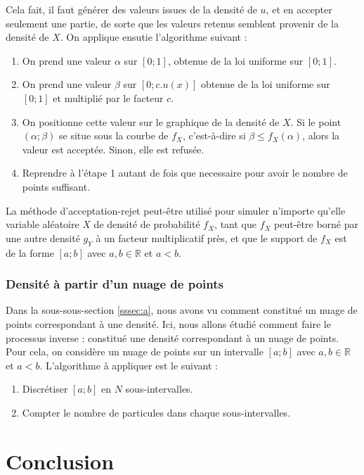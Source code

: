 \documentclass{article}
\begin{document}
Cela fait, il faut générer des valeurs issues de la densité de $u$, et en accepter seulement une partie, de sorte que les valeurs retenus semblent provenir de la densité de $X$. On applique ensutie l'algorithme suivant :
\begin{enumerate}
\item On prend une valeur $\alpha$ sur $[0;1]$, obtenue de la loi uniforme sur $[0;1]$.
\item On prend une valeur $\beta$ sur $[0;c.u(x)]$ obtenue de la loi uniforme sur $[0;1]$ et multiplié par le facteur $c$.
\item On positionne cette valeur sur le graphique de la densité de $X$. Si le point $(\alpha; \beta)$ se situe sous la courbe de $f_X$, c'est-à-dire si $\beta \leq f_X(\alpha)$, alors la valeur est acceptée. Sinon, elle est refusée.
\item Reprendre à l'étape 1 autant de fois que necessaire pour avoir le nombre de points suffisant.
\end{enumerate}
\begin{center}
\end{center}
La méthode d'acceptation-rejet peut-être utilisé pour simuler n'importe qu'elle variable aléatoire $X$ de densité de probabilité $f_X$, tant que $f_X$ peut-être borné par une autre densité $g_Y$ à un facteur multiplicatif près, et que le support de $f_X$ est de la forme $[a;b]$ avec $a,b \in \mathbb{R}$ et $a < b$.
\subsubsection{Densité à partir d'un nuage de points}
Dans la sous-sous-section \ref{sssec:a}, nous avons vu comment constitué un nuage de points correspondant à une densité. Ici, nous allons étudié comment faire le processus inverse : constitué une densité correspondant à un nuage de points.\\
Pour cela, on considère un nuage de points sur un intervalle $[a;b]$ avec $a,b \in \mathbb{R}$ et $a < b$. L'algorithme à appliquer est le suivant :
\begin{enumerate}
\item Discrétiser $[a;b]$ en $N$ sous-intervalles.
\item Compter le nombre de particules dans chaque sous-intervalles.
\end{enumerate}
\section{Conclusion}
\end{document}
